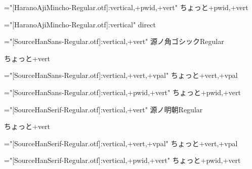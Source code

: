 \font\hmrpwidvert="[HaranoAjiMincho-Regular.otf]:vertical,+pwid,+vert"
\hmrpwidvert
ちょっと+pwid,+vert

\font\hmrdirect="[HaranoAjiMincho-Regular.otf]:vertical"
\hmrdirect
{}%
direct

\font\sar="[SourceHanSans-Regular.otf]:vertical,+vert"
\sar
源ノ角ゴシックRegular

ちょっと+vert

\font\sarvpal="[SourceHanSans-Regular.otf]:vertical,+vert,+vpal"
\sarvpal
ちょっと+vert,+vpal

\font\sarpwidvert="[SourceHanSans-Regular.otf]:vertical,+pwid,+vert"
\sarpwidvert
ちょっと+pwid,+vert

\font\ser="[SourceHanSerif-Regular.otf]:vertical,+vert"
\ser
源ノ明朝Regular

ちょっと+vert

\font\servpal="[SourceHanSerif-Regular.otf]:vertical,+vert,+vpal"
\servpal
ちょっと+vert,+vpal

\font\serpwidvert="[SourceHanSerif-Regular.otf]:vertical,+pwid,+vert"
\serpwidvert
ちょっと+pwid,+vert

\bye
